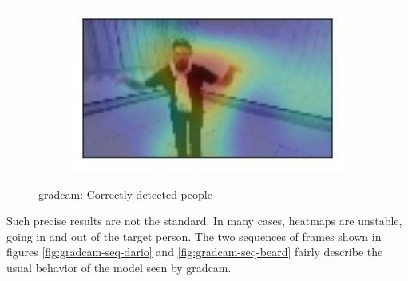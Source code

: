 \begin{figure}[!h]
\begin{center}
\begin{subfigure}[h]{0.24\textwidth}
		\end{subfigure}
		\hfill
		\begin{subfigure}[h]{0.24\textwidth}
			\centering
			\includegraphics[width=1\textwidth]{"contents/images/gradcam/gradcam-ok-4"}
		\end{subfigure}
	\end{center}
	\vspace{-0.5cm}
	\caption[\gls{gradcam}: Correctly detected people]{\gls{gradcam}: Correctly detected people}
	\label{fig:gradcam-ok}
\end{figure}

Such precise results are not the standard. In many cases, heatmaps are unstable, going in and out of the target person. The two sequences of frames shown in figures \ref{fig:gradcam-seq-dario} and \ref{fig:gradcam-seq-beard} fairly describe the usual behavior of the model seen by \gls{gradcam}.

